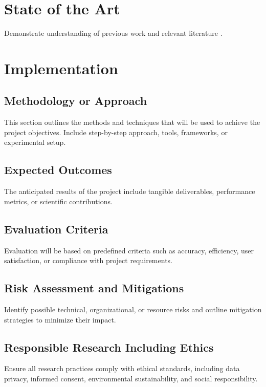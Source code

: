 \documentclass[a4paper,11pt]{article}
\begin{document}
\section{State of the Art}
Demonstrate understanding of previous work and relevant literature \cite{template}.


\section{Implementation}

\subsection{Methodology or Approach}
This section outlines the methods and techniques that will be used to achieve
the project objectives. Include step-by-step approach, tools, frameworks, or
experimental setup.

\subsection{Expected Outcomes}
The anticipated results of the project include tangible deliverables, performance
metrics, or scientific contributions.

\subsection{Evaluation Criteria}
Evaluation will be based on predefined criteria such as accuracy, efficiency, user satisfaction, or compliance with project requirements.


\subsection{Risk Assessment and Mitigations}
Identify possible technical, organizational, or resource risks and outline mitigation
strategies to minimize their impact.

\subsection{Responsible Research Including Ethics}
Ensure all research practices comply with ethical standards, including data privacy,
informed consent, environmental sustainability, and social responsibility.
\end{document}
